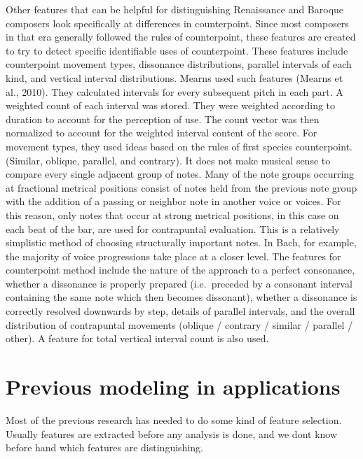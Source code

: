 \documentclass[12pt,twoside]{reedthesis}
\theoremstyle{definition}
\theoremstyle{definition}
\theoremstyle{definition}
\theoremstyle{remark}
\begin{document}
Other features that can be helpful for distinguishing Renaissance and
Baroque composers look specifically at differences in counterpoint.
Since most composers in that era generally followed the rules of
counterpoint, these features are created to try to detect specific
identifiable uses of counterpoint. These features include counterpoint
movement types, dissonance distributions, parallel intervals of each
kind, and vertical interval distributions. Mearns used such features
(Mearns et al., 2010). They calculated intervals for every subsequent
pitch in each part. A weighted count of each interval was stored. They
were weighted according to duration to account for the perception of
use. The count vector was then normalized to account for the weighted
interval content of the score. For movement types, they used ideas based
on the rules of first species counterpoint. (Similar, oblique, parallel,
and contrary). It does not make musical sense to compare every single
adjacent group of notes. Many of the note groups occurring at fractional
metrical positions consist of notes held from the previous note group
with the addition of a passing or neighbor note in another voice or
voices. For this reason, only notes that occur at strong metrical
positions, in this case on each beat of the bar, are used for
contrapuntal evaluation. This is a relatively simplistic method of
choosing structurally important notes. In Bach, for example, the
majority of voice progressions take place at a closer level. The
features for counterpoint method include the nature of the approach to a
perfect consonance, whether a dissonance is properly prepared
(i.e.~preceded by a consonant interval containing the same note which
then becomes dissonant), whether a dissonance is correctly resolved
downwards by step, details of parallel intervals, and the overall
distribution of contrapuntal movements (oblique / contrary / similar /
parallel / other). A feature for total vertical interval count is also
used.

\section{Previous modeling in
applications}\label{previous-modeling-in-applications}

Most of the previous research has needed to do some kind of feature
selection. Usually features are extracted before any analysis is done,
and we dont know before hand which features are distinguishing.
\end{document}
